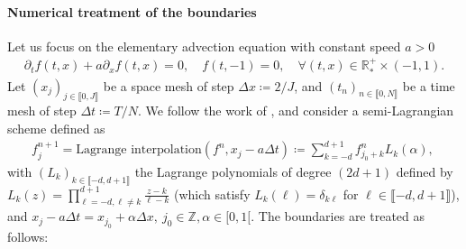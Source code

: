 \documentclass{article}
\numberwithin{equation}{section}
\newcommand{\N}{\mathbb{N}}
\newcommand{\R}{\mathbb{R}}
\newcommand{\todo}[1]{{\color{red}\textbf{#1}}}
\begin{document}


\paragraph{Numerical treatment of the boundaries}

Let us focus on the elementary advection equation with constant speed $a>0$
\begin{align*}
	\partial_t f (t,x) + a \partial_x f(t,x) = 0, \quad f(t,-1) = 0, \quad \forall (t,x) \in \R^+_* \times (-1,1).
\end{align*}
Let $(x_j)_{j\in\llbracket0,J\rrbracket}$ be a space mesh of step $\Delta x \coloneqq 2/J$, and $(t_n)_{n\in\llbracket 0,N \rrbracket}$ be a time mesh of step $\Delta t \coloneqq T/N$.
We follow the work of \cite{coulombelNeumannNumericalBoundary2020, boutinHighOrderNumerical2021}, and consider a semi-Lagrangian scheme defined as
\begin{align*}
	f^{n+1}_j = \text{Lagrange interpolation}\left(f^n, x_j - a \Delta t\right) \coloneqq \sum_{k=-d}^{d+1} f^n_{j_0+k} L_k (\alpha), \ 
\end{align*}
with $(L_k)_{k\in\llbracket-d,d+1\rrbracket}$ the Lagrange polynomials of degree $(2d+1)$ defined by $L_k(z)=\prod_{\ell=-d,\ell\not=k}^{d+1}\frac{z-k}{\ell-k}$
(which satisfy $L_k(\ell) = \delta_{k\ell}$ for $\ell\in \llbracket-d,d+1\rrbracket$), and $x_j - a \Delta t = x_{j_0}+\alpha \Delta x,\ j_0\in \mathbb{Z}, \alpha\in [0,1[$.
The boundaries are treated as follows:
\end{document}
